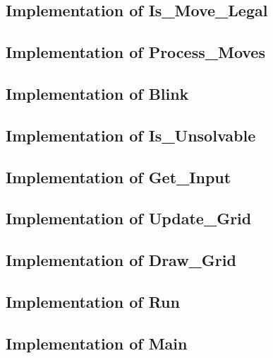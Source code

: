 \subsection{Implementation of Is\_Move\_Legal}


\subsection{Implementation of Process\_Moves}


\newpage

\subsection{Implementation of Blink}


\newpage

\subsection{Implementation of Is\_Unsolvable}


\newpage

\subsection{Implementation of Get\_Input}


\subsection{Implementation of Update\_Grid}


\subsection{Implementation of Draw\_Grid}


\newpage

\subsection{Implementation of Run}


\subsection{Implementation of Main}


\newpage
